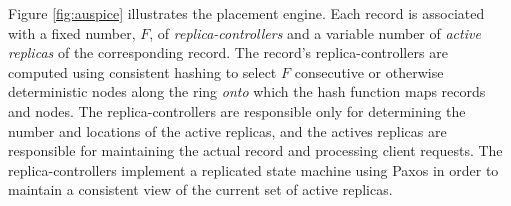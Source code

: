 Figure \ref{fig:auspice} illustrates the placement engine. Each record is associated with a fixed number, $F$, of  \emph{replica-controllers} and a variable number of  {\em active replicas} of the corresponding record. The record's replica-controllers are computed using consistent hashing to select $F$ consecutive or otherwise deterministic nodes along the ring {\em onto} which the hash function maps records and nodes. The replica-controllers are responsible only for determining the number and locations of the active  replicas, and the actives replicas are responsible for maintaining the actual record and processing client requests. The replica-controllers implement a replicated state machine using Paxos \cite{LamportPaxos} in order to maintain a consistent view of the current set of active replicas.




%
%
%
%





